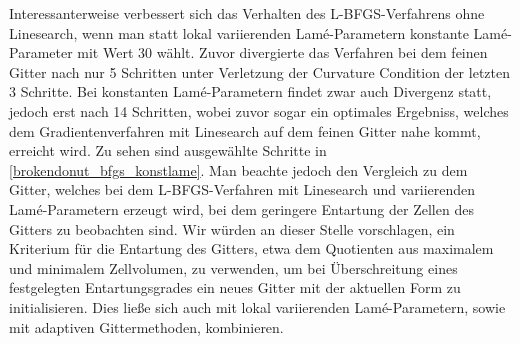Interessanterweise verbessert sich das Verhalten des L-BFGS-Verfahrens ohne Linesearch, wenn man statt lokal variierenden Lamé-Parametern konstante Lamé-Parameter mit Wert 30 wählt. Zuvor divergierte das Verfahren bei dem feinen Gitter nach nur 5 Schritten unter Verletzung der Curvature Condition der letzten 3 Schritte. Bei konstanten Lamé-Parametern findet zwar auch Divergenz statt, jedoch erst nach 14 Schritten, wobei zuvor sogar ein optimales Ergebniss, welches dem Gradientenverfahren mit Linesearch auf dem feinen Gitter nahe kommt, erreicht wird. Zu sehen sind ausgewählte Schritte in \ref{brokendonut_bfgs_konstlame}. Man beachte jedoch den Vergleich zu dem Gitter, welches bei dem L-BFGS-Verfahren mit Linesearch und variierenden Lamé-Parametern erzeugt wird, bei dem geringere Entartung der Zellen des Gitters zu beobachten sind. Wir würden an dieser Stelle vorschlagen, ein Kriterium für die Entartung des Gitters, etwa dem Quotienten aus maximalem und minimalem Zellvolumen, zu verwenden, um bei Überschreitung eines festgelegten Entartungsgrades ein neues Gitter mit der aktuellen Form zu initialisieren. Dies ließe sich auch mit lokal variierenden Lamé-Parametern, sowie mit adaptiven Gittermethoden, kombinieren.

